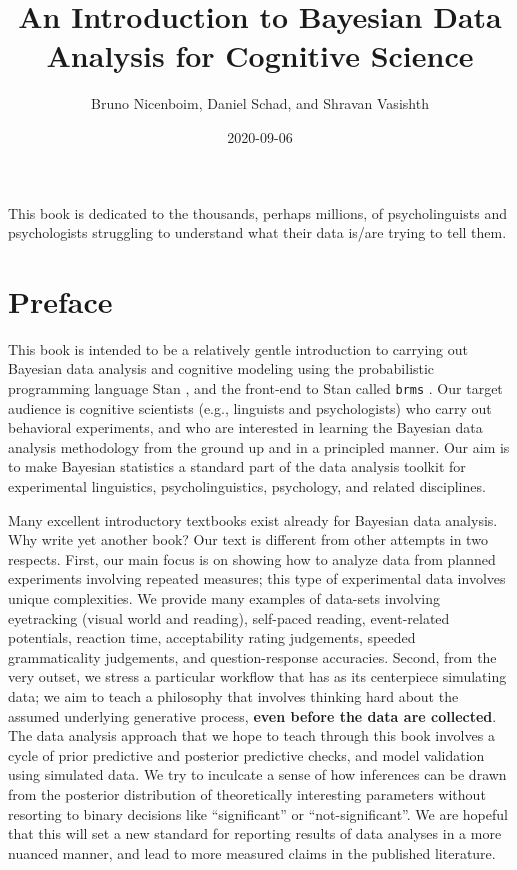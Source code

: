 \documentclass[12pt,]{krantz}
\title{An Introduction to Bayesian Data Analysis for Cognitive Science}
\author{Bruno Nicenboim, Daniel Schad, and Shravan Vasishth}
\date{2020-09-06}
\theoremstyle{definition}
\theoremstyle{definition}
\theoremstyle{definition}
\theoremstyle{remark}
\begin{document}
\maketitle

\thispagestyle{empty}
\begin{center}
This book is dedicated to the thousands, perhaps millions, of psycholinguists and psychologists struggling to understand what their data is/are trying to tell them.
\end{center}

\setlength{\abovedisplayskip}{-5pt}
\setlength{\abovedisplayshortskip}{-5pt}

{
\hypersetup{linkcolor=black}
\setcounter{tocdepth}{2}
\tableofcontents
}
\chapter*{Preface}\label{preface}


This book is intended to be a relatively gentle introduction to carrying
out Bayesian data analysis and cognitive modeling using the
probabilistic programming language Stan \citep{carpenter2017stan}, and
the front-end to Stan called \texttt{brms} \citep{R-brms}. Our target
audience is cognitive scientists (e.g., linguists and psychologists) who
carry out behavioral experiments, and who are interested in learning the
Bayesian data analysis methodology from the ground up and in a
principled manner. Our aim is to make Bayesian statistics a standard
part of the data analysis toolkit for experimental linguistics,
psycholinguistics, psychology, and related disciplines.

Many excellent introductory textbooks exist already for Bayesian data
analysis. Why write yet another book? Our text is different from other
attempts in two respects. First, our main focus is on showing how to
analyze data from planned experiments involving repeated measures; this
type of experimental data involves unique complexities. We provide many
examples of data-sets involving eyetracking (visual world and reading),
self-paced reading, event-related potentials, reaction time,
acceptability rating judgements, speeded grammaticality judgements, and
question-response accuracies. Second, from the very outset, we stress a
particular workflow that has as its centerpiece simulating data; we aim
to teach a philosophy that involves thinking hard about the assumed
underlying generative process, \textbf{even before the data are
collected}. The data analysis approach that we hope to teach through
this book involves a cycle of prior predictive and posterior predictive
checks, and model validation using simulated data. We try to inculcate a
sense of how inferences can be drawn from the posterior distribution of
theoretically interesting parameters without resorting to binary
decisions like ``significant'' or ``not-significant''. We are hopeful
that this will set a new standard for reporting results of data analyses
in a more nuanced manner, and lead to more measured claims in the
published literature.
\end{document}
